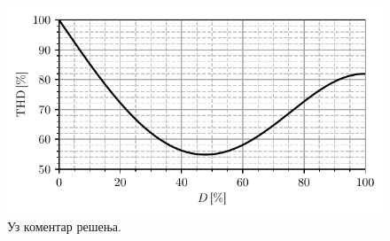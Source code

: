 \begin{figure}
    \centering
    \includegraphics{fig/THD_plot.pdf}
    \caption{Уз коментар решења.}
    \label{\ID.comm}
\end{figure}